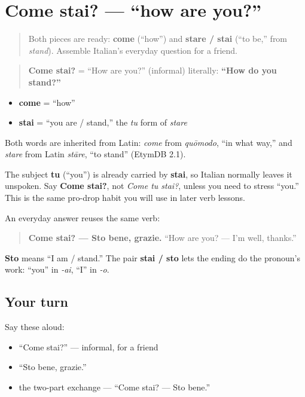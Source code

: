 \section[Come stai?]{Come stai? — “how are you?”}

\label{lesson:IT-C02-come-stai}



\begin{quote}
Both pieces are ready: \textbf{come} (“how”) and \textbf{stare / stai} (“to be,” from \emph{stand}). Assemble Italian’s everyday question for a friend.
\end{quote}

\begin{cousinweb}
\begin{quote}
\textbf{Come stai?} = “How are you?” (informal) literally: \textbf{“How do you stand?”}
\end{quote}

\begin{itemize}
\raggedright
  \item \textbf{come} = “how”
  \item \textbf{stai} = “you are / stand,” the \emph{tu} form of \emph{stare}
\end{itemize}

Both words are inherited from Latin: \emph{come} from \emph{quōmodo}, “in what way,” and \emph{stare} from Latin \emph{stāre}, “to stand” (EtymDB 2.1).

The subject \textbf{tu} (“you”) is already carried by \textbf{stai}, so Italian normally leaves it unspoken. Say \textbf{Come stai?}, not \emph{Come tu stai?}, unless you need to stress “you.” This is the same pro-drop habit you will use in later verb lessons.

An everyday answer reuses the same verb:

\begin{quote}
\textbf{Come stai? — Sto bene, grazie.} “How are you? — I’m well, thanks.”
\end{quote}

\textbf{Sto} means “I am / stand.” The pair \textbf{stai / sto} lets the ending do the pronoun’s work: “you” in \emph{-ai}, “I” in \emph{-o}.
\end{cousinweb}

\subsection*{Your turn}
Say these aloud:

\begin{itemize}
\raggedright
  \item “Come stai?” — informal, for a friend
  \item “Sto bene, grazie.”
  \item the two-part exchange — “Come stai? — Sto bene.”
\end{itemize}

